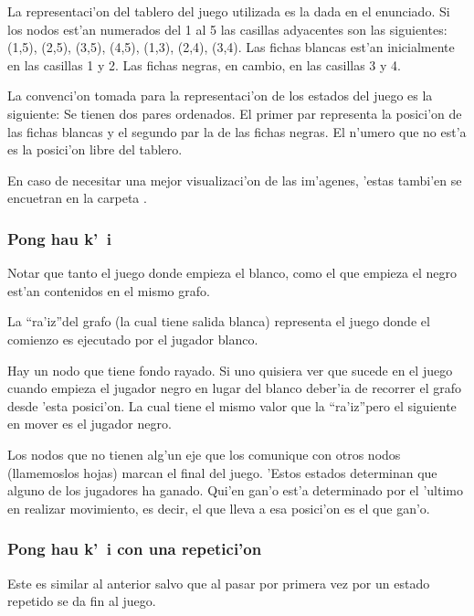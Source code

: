 La representaci'on del tablero del juego utilizada es la dada en el enunciado. Si los nodos est'an numerados del 1 al 5 las casillas adyacentes son las siguientes: (1,5), (2,5), (3,5), (4,5), (1,3), (2,4), (3,4). Las fichas blancas est'an inicialmente en las casillas 1 y 2. Las fichas negras, en cambio, en las casillas 3 y 4.

La convenci'on tomada para la representaci'on de los estados del juego es la siguiente: Se tienen dos pares ordenados. El primer par representa la posici'on de las fichas blancas y el segundo par la de las fichas negras. El n'umero que no est'a es la posici'on libre del tablero.

En caso de necesitar una mejor visualizaci'on de las im'agenes, 'estas tambi'en se encuetran en la carpeta .

\subsubsection{Pong hau k'\ i}

Notar que tanto el juego donde empieza el blanco, como el que empieza el negro est'an contenidos en el mismo grafo.

La \textquotedblleft ra'iz\textquotedblright  del grafo (la cual tiene salida blanca) representa el juego donde el comienzo es ejecutado por el jugador blanco.

Hay un nodo que tiene fondo rayado. Si uno quisiera ver que sucede en el juego cuando empieza el jugador negro en lugar del blanco deber'ia de recorrer el grafo desde 'esta posici'on. La cual tiene el mismo valor que la \textquotedblleft ra'iz\textquotedblright pero el siguiente en mover es el jugador negro.

Los nodos que no tienen alg'un eje que los comunique con otros nodos (llamemoslos hojas) marcan el final del juego. 'Estos estados determinan que alguno de los jugadores ha ganado. Qui'en gan'o est'a determinado por el 'ultimo en realizar movimiento, es decir, el que lleva a esa posici'on es el que gan'o.

\clearpage

\subsubsection{Pong hau k'\ i con una repetici'on}

Este es similar al anterior salvo que al pasar por primera vez por un estado repetido se da fin al juego.

